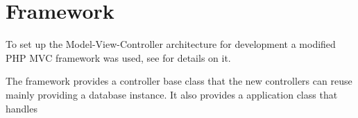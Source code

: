 \section{Framework}
To set up the Model-View-Controller architecture for development a modified PHP MVC framework was used, see \citep{misc:mvc-framework} for details on it.

The framework provides a controller base class that the new controllers can reuse mainly providing a database instance. It also provides a application class that handles 